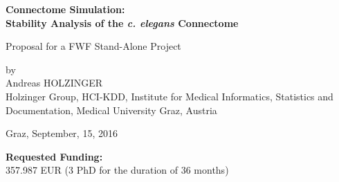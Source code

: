 \documentclass[a4paper,11pt]{article}
\begin{document}
\begin{titlepage}
\begin{center}
\bfseries\Large
Connectome Simulation:\\
Stability Analysis of the \emph{c. elegans} Connectome
\\[0,6cm]
\normalfont\normalsize

Proposal for a FWF Stand-Alone Project

by\\
Andreas HOLZINGER\\

Holzinger Group, HCI-KDD, Institute for Medical Informatics, Statistics and Documentation,
Medical University Graz, Austria
\\[0,4cm]
\vspace{0.7\baselineskip}
\begin{figure}[ht]
  \centering
\end{figure}
%
Graz, September, 15, 2016 
%
\end{center}
\vspace{0.5\baselineskip}
\end{titlepage}
%
%
{\bf Requested Funding:}\\ 357.987 EUR (3 PhD for the duration of 36 months) 
\end{document}
